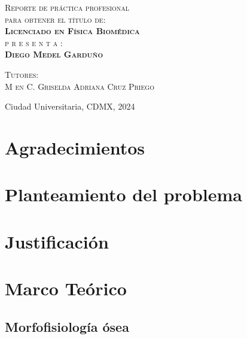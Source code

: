 \documentclass[letterpaper,12pt,oneside]{book}
\begin{document}
\begin{titlepage}
\begin{minipage}[c][0.81\textheight][t]{0.75\textwidth}
\begin{center}
                \vspace{2cm}            

                \textsc{\large Reporte de práctica profesional}\\[0.5cm]
                \textsc{\large para obtener el t\'itulo de:}\\[1.5cm]
                \textbf{\textsc{\Large Licenciado en Física Biomédica}}\\[2 cm]
                \textsc{\Large p r e s e n t a :}\\[0.5cm]
                \textbf{\textsc{\large {Diego Medel Garduño}}}\\[2cm]          

                \vspace{0.5cm}

                {\large\scshape Tutores:\\[0.3cm] {M en C. Griselda Adriana Cruz Priego}}\\[.2in]

                \vspace{0.5cm}

                \large{Ciudad Universitaria, CDMX,}{ }{2024}
            \end{center}
        \end{minipage}
    \end{titlepage}

    \frontmatter
    \chapter{Agradecimientos}

    \newpage

    \tableofcontents
    \mainmatter


    \chapter{Planteamiento del problema}
    \chapter{Justificación}
    

    

    \chapter{Marco Teórico}
    \section{Morfofisiología ósea}
\end{document}
